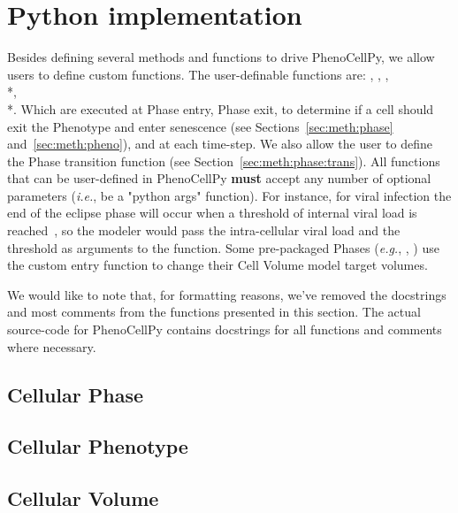 \section{\pcps Python implementation}\label{sec:meth-old}


Besides defining several methods and functions to drive PhenoCellPy, we allow users to define custom functions. The user-definable functions are: , , , \\*, \\*. Which are executed at Phase entry, Phase exit, to determine if a cell should exit the Phenotype and enter senescence (see Sections~\ref{sec:meth:phase} and~\ref{sec:meth:pheno}), and at each time-step. We also allow the user to define the Phase transition function (see Section~\ref{sec:meth:phase:trans}). All functions that can be user-defined in PhenoCellPy \textbf{must} accept any number of optional parameters (\textit{i.e.}, be a "python args" function). For instance, for viral infection the end of the eclipse phase will occur when a threshold of internal viral load is reached~\cite{sego_modular_2020}, so the modeler would pass the intra-cellular viral load and the threshold as arguments to the function. Some pre-packaged Phases (\textit{e.g.}, , ) use the custom entry function to change their Cell Volume model target volumes. 

We would like to note that, for formatting reasons, we've removed the docstrings and most comments from the functions presented in this section. The actual source-code for PhenoCellPy contains docstrings for all functions and comments where necessary.

\subsection{Cellular Phase}\label{sec:methsec:meth-old:phase}



\subsection{Cellular Phenotype}\label{sec:methsec:meth-old:pheno}


\subsection{Cellular Volume}\label{sec:methsec:meth-old:vol}


% 
